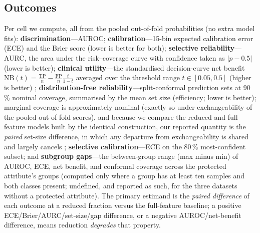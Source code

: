 \documentclass[fleqn,10pt]{wlscirep}
\begin{document}
\subsection{Outcomes}
Per cell we compute, all from the pooled out-of-fold probabilities (no extra model fits):
\textbf{discrimination}---AUROC; \textbf{calibration}---15-bin expected calibration error (ECE) and the
Brier score (lower is better for both); \textbf{selective reliability}---AURC, the area under the
risk--coverage curve with confidence taken as $|p-0.5|$ (lower is better); \textbf{clinical
utility}---the standardised decision-curve net benefit $\mathrm{NB}(t)=\tfrac{\mathrm{TP}}{n}-\tfrac{\mathrm{FP}}{n}\tfrac{t}{1-t}$
averaged over the threshold range $t\in[0.05,0.5]$ (higher is better) \cite{vickers2006decision};
\textbf{distribution-free reliability}---split-conformal prediction sets at 90\,\% nominal coverage,
summarised by the mean set size (efficiency; lower is better); marginal coverage is approximately
nominal (exactly so under exchangeability of the pooled out-of-fold scores), and because we compare the
reduced and full-feature models built by the identical construction, our reported quantity is the
\emph{paired} set-size difference, in which any departure from exchangeability is shared and largely
cancels \cite{romano2020classification,angelopoulos2023conformal};
\textbf{selective calibration}---ECE on the 80\,\% most-confident subset; and \textbf{subgroup
gaps}---the between-group range (max minus min) of AUROC, ECE, net benefit, and conformal coverage
across the protected attribute's groups (computed only where a group has at least ten samples and both
classes present; undefined, and reported as such, for the three datasets without a protected
attribute). The primary estimand is the \emph{paired difference} of each outcome at a reduced fraction
versus the full-feature baseline; a positive ECE/Brier/AURC/set-size/gap difference, or a negative
AUROC/net-benefit difference, means reduction \emph{degrades} that property.
\end{document}
